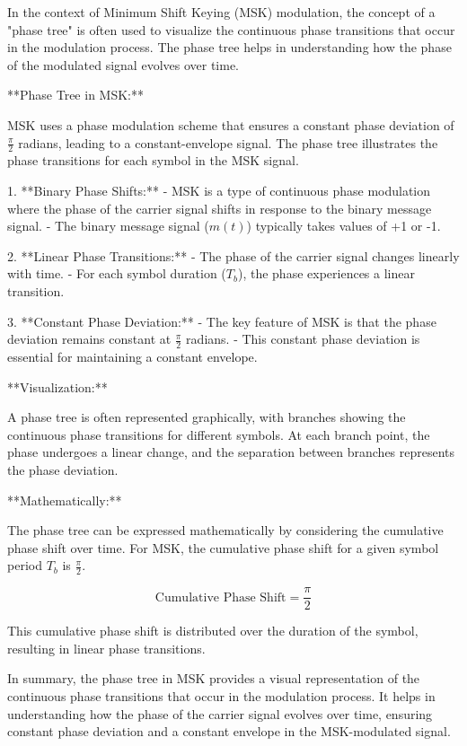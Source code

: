 \documentclass[colorlinks,11pt,a4paper,normalphoto,withhyper,ragged2e]{altareport}
\begin{document}
				
				In the context of Minimum Shift Keying (MSK) modulation, the concept of a "phase tree" is often used to visualize the continuous phase transitions that occur in the modulation process. The phase tree helps in understanding how the phase of the modulated signal evolves over time.
				
				**Phase Tree in MSK:**
				
				MSK uses a phase modulation scheme that ensures a constant phase deviation of \(\frac{\pi}{2}\) radians, leading to a constant-envelope signal. The phase tree illustrates the phase transitions for each symbol in the MSK signal.
				
				1. **Binary Phase Shifts:**
				- MSK is a type of continuous phase modulation where the phase of the carrier signal shifts in response to the binary message signal.
				- The binary message signal (\(m(t)\)) typically takes values of +1 or -1.
				
				2. **Linear Phase Transitions:**
				- The phase of the carrier signal changes linearly with time.
				- For each symbol duration (\(T_b\)), the phase experiences a linear transition.
				
				3. **Constant Phase Deviation:**
				- The key feature of MSK is that the phase deviation remains constant at \(\frac{\pi}{2}\) radians.
				- This constant phase deviation is essential for maintaining a constant envelope.
				
				**Visualization:**
				
				A phase tree is often represented graphically, with branches showing the continuous phase transitions for different symbols. At each branch point, the phase undergoes a linear change, and the separation between branches represents the phase deviation.
				
				**Mathematically:**
				
				The phase tree can be expressed mathematically by considering the cumulative phase shift over time. For MSK, the cumulative phase shift for a given symbol period \(T_b\) is \(\frac{\pi}{2}\).
				
				\[ \text{Cumulative Phase Shift} = \frac{\pi}{2} \]
				
				This cumulative phase shift is distributed over the duration of the symbol, resulting in linear phase transitions.
				
				In summary, the phase tree in MSK provides a visual representation of the continuous phase transitions that occur in the modulation process. It helps in understanding how the phase of the carrier signal evolves over time, ensuring constant phase deviation and a constant envelope in the MSK-modulated signal.
				
\end{document}

